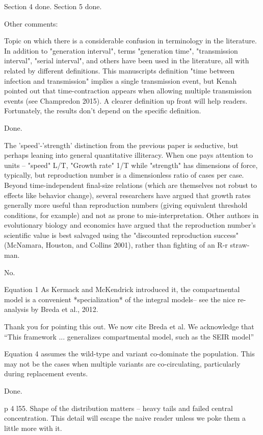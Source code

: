 \documentclass[12pt]{article}
\newcommand{\revtext}{\textsf}
\begin{document}
Section 4 done. Section 5 done.

\revtext{Other comments:}

\revtext{Topic on which there is a considerable confusion in terminology in the literature.  In addition to "generation interval", terms "generation time", "transmission interval", "serial interval", and others have been used in the literature, all with related by different definitions.  This manuscripts definition "time between infection and transmission" implies a single transmission event, but Kenah pointed out that time-contraction appears when allowing multiple transmission events (see Champredon 2015).  A clearer definition up front will help readers.  Fortunately, the results don't depend on the specific definition.}

Done.

\revtext{The 'speed'-'strength' distinction from the previous paper is seductive, but perhaps leaning into general quantitative illiteracy.  When one pays attention to units -- "speed" L/T,  "Growth rate" 1/T while "strength" has dimensions of force, typically, but reproduction number is a dimensionless ratio of cases per case.  Beyond time-independent final-size relations (which are themselves not robust to effects like behavior change), several researchers have argued that growth rates generally more useful than reproduction numbers (giving equivalent threshold conditions, for example) and not as prone to mis-interpretation.  Other authors in evolutionary biology and economics have argued that the reproduction number's scientific value is best salvaged using the "discounted reproduction success" (McNamara, Houston, and Collins 2001), rather than fighting of an R-r straw-man.}

No.

\revtext{Equation 1 As Kermack and McKendrick introduced it, the compartmental model is a convenient *specialization* of the integral models-- see the nice re-analysis by Breda et al., 2012.}

Thank you for pointing this out. We now cite Breda et al. We acknowledge that ``This framework ... generalizes compartmental model, such as the SEIR model''

\revtext{Equation 4 assumes the wild-type and variant co-dominate the population.  This may not be the cases when multiple variants are co-circulating, particularly during replacement events.}

Done.

\revtext{p 4 l55.  Shape of the distribution matters -- heavy tails and failed central concentration.  This detail will escape the naive reader unless we poke them a little more with it.}
\end{document}
